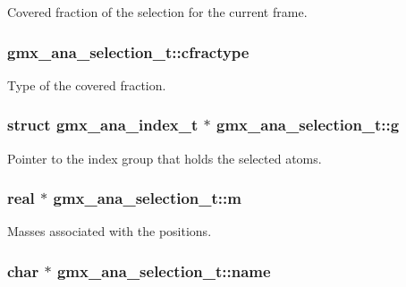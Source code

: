 \-Covered fraction of the selection for the current frame. \hypertarget{structgmx__ana__selection__t_acef74bfc8e4ad3d45f9ed1607acb5837}{
\subsubsection[{cfractype}]{ {\bf gmx\-\_\-ana\-\_\-selection\-\_\-t\-::cfractype}}}\label{structgmx__ana__selection__t_acef74bfc8e4ad3d45f9ed1607acb5837}
\-Type of the covered fraction. \hypertarget{structgmx__ana__selection__t_a20390f0b950e6be7bc2cde12d128f8f1}{
\subsubsection[{g}]{\setlength{\rightskip}{0pt plus 5cm}struct {\bf gmx\-\_\-ana\-\_\-index\-\_\-t} $\ast$ {\bf gmx\-\_\-ana\-\_\-selection\-\_\-t\-::g}}}\label{structgmx__ana__selection__t_a20390f0b950e6be7bc2cde12d128f8f1}
\-Pointer to the index group that holds the selected atoms. \hypertarget{structgmx__ana__selection__t_adc77a2a849982e2494cbc3fa395ea75c}{
\subsubsection[{m}]{\setlength{\rightskip}{0pt plus 5cm}real $\ast$ {\bf gmx\-\_\-ana\-\_\-selection\-\_\-t\-::m}}}\label{structgmx__ana__selection__t_adc77a2a849982e2494cbc3fa395ea75c}
\-Masses associated with the positions. \hypertarget{structgmx__ana__selection__t_ad91f87c41782ba9ab6bfba8fca6b302b}{
\subsubsection[{name}]{\setlength{\rightskip}{0pt plus 5cm}char $\ast$ {\bf gmx\-\_\-ana\-\_\-selection\-\_\-t\-::name}}}\label{structgmx__ana__selection__t_ad91f87c41782ba9ab6bfba8fca6b302b}
